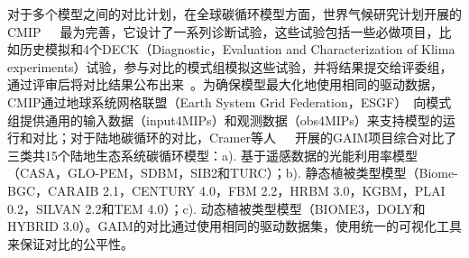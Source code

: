 
对于多个模型之间的对比计划，在全球碳循环模型方面，世界气候研究计划开展的CMIP~\cite{meehl2000coupled}~\cite{Taylor2012An}~\cite{eyring2016overview}最为完善，它设计了一系列诊断试验，这些试验包括一些必做项目，比如历史模拟和4个DECK（Diagnostic，Evaluation and Characterization of Klima experiments）试验，参与对比的模式组模拟这些试验，并将结果提交给评委组，通过评审后将对比结果公布出来~\cite{2016-zhaozongci}。为确保模型最大化地使用相同的驱动数据，CMIP通过地球系统网格联盟（Earth System Grid Federation，ESGF）~\cite{williams2011earth}向模式组提供通用的输入数据（input4MIPs）和观测数据（obs4MIPs）来支持模型的运行和对比；对于陆地碳循环的对比，Cramer等人~\cite{cramer1999comparing}~\cite{kicklighter1999comparing}~\cite{bondeau1999comparing}开展的GAIM项目综合对比了三类共15个陆地生态系统碳循环模型：a). 基于遥感数据的光能利用率模型（CASA，GLO-PEM，SDBM，SIB2和TURC）；b). 静态植被类型模型（Biome-BGC，CARAIB 2.1，CENTURY 4.0，FBM 2.2，HRBM 3.0，KGBM，PLAI 0.2，SILVAN 2.2和TEM 4.0）；c). 动态植被类型模型（BIOME3，DOLY和HYBRID 3.0）。GAIM的对比通过使用相同的驱动数据集，使用统一的可视化工具来保证对比的公平性。





